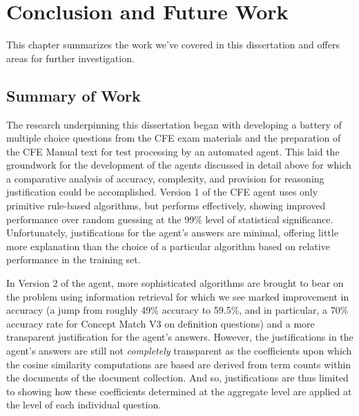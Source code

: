  

\chapter{Conclusion and Future Work}

This chapter summarizes the work we’ve covered in this dissertation and offers areas for further investigation.

\section{Summary of Work}

The research underpinning this dissertation began with developing a battery of multiple choice questions from the CFE exam materials and the preparation of the CFE Manual text for test processing by an automated agent. This laid the groundwork for the development of the agents discussed in detail above for which a comparative analysis of accuracy, complexity, and provision for reasoning justification could be accomplished.  Version 1 of the CFE agent uses only primitive rule-based algorithms, but performs effectively, showing improved performance over random guessing at the 99\% level of statistical significance.  Unfortunately, justifications for the agent’s answers are minimal, offering little more explanation than the choice of a particular algorithm based on relative performance in the training set.  

In Version 2 of the agent, more sophisticated algorithms are brought to bear on the problem using information retrieval for which we see marked improvement in accuracy (a jump from roughly 49\% accuracy to 59.5\%, and in particular, a 70\% accuracy rate for Concept Match V3 on definition questions) and a more transparent justification for the agent’s answers. However, the justifications in the agent's answers are still not \emph{completely} transparent as the coefficients upon which the cosine similarity computations are based are derived from term counts within the documents of the document collection. And so, justifications are thus limited to showing how these coefficients determined at the aggregate level are applied at the level of each individual question.

